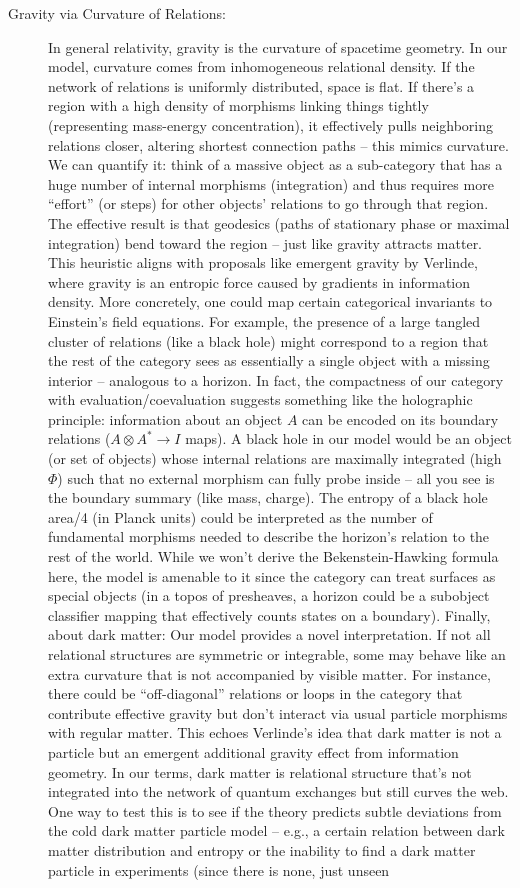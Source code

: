 \documentclass{article}
\begin{document}
\begin{description}
\item[Gravity via Curvature of Relations:] In general relativity, gravity is the curvature of spacetime geometry. In our model, curvature comes from inhomogeneous relational density. If the network of relations is uniformly distributed, space is flat. If there’s a region with a high density of morphisms linking things tightly (representing mass-energy concentration), it effectively pulls neighboring relations closer, altering shortest connection paths – this mimics curvature. We can quantify it: think of a massive object as a sub-category that has a huge number of internal morphisms (integration) and thus requires more “effort” (or steps) for other objects’ relations to go through that region. The effective result is that geodesics (paths of stationary phase or maximal integration) bend toward the region – just like gravity attracts matter. This heuristic aligns with proposals like emergent gravity by Verlinde, where gravity is an entropic force caused by gradients in information density\cite{verlinde2011}. More concretely, one could map certain categorical invariants to Einstein’s field equations. For example, the presence of a large tangled cluster of relations (like a black hole) might correspond to a region that the rest of the category sees as essentially a single object with a missing interior – analogous to a horizon. In fact, the compactness of our category with evaluation/coevaluation suggests something like the holographic principle: information about an object $A$ can be encoded on its boundary relations ($A \otimes A^* \to I$ maps). A black hole in our model would be an object (or set of objects) whose internal relations are maximally integrated (high $\Phi$) such that no external morphism can fully probe inside – all you see is the boundary summary (like mass, charge). The entropy of a black hole ~ area/4 (in Planck units) could be interpreted as the number of fundamental morphisms needed to describe the horizon’s relation to the rest of the world\cite{bekenstein1973}. While we won’t derive the Bekenstein-Hawking formula here, the model is amenable to it since the category can treat surfaces as special objects (in a topos of presheaves, a horizon could be a subobject classifier mapping that effectively counts states on a boundary). Finally, about dark matter: Our model provides a novel interpretation. If not all relational structures are symmetric or integrable, some may behave like an extra curvature that is not accompanied by visible matter. For instance, there could be “off-diagonal” relations or loops in the category that contribute effective gravity but don’t interact via usual particle morphisms with regular matter. This echoes Verlinde’s idea that dark matter is not a particle but an emergent additional gravity effect from information geometry\cite{verlinde2016}. In our terms, dark matter is relational structure that’s not integrated into the network of quantum exchanges but still curves the web. One way to test this is to see if the theory predicts subtle deviations from the cold dark matter particle model – e.g., a certain relation between dark matter distribution and entropy or the inability to find a dark matter particle in experiments (since there is none, just unseen 
\end{description}
\end{document}
